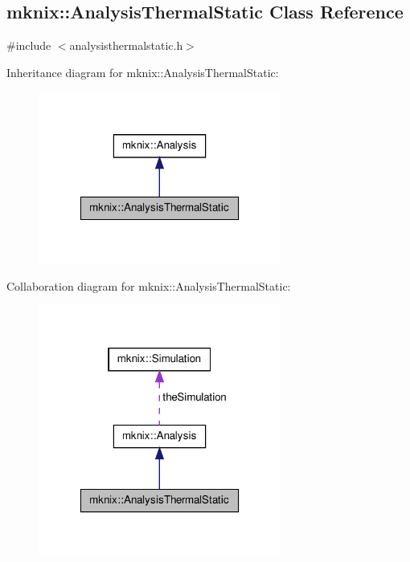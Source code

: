 \hypertarget{classmknix_1_1_analysis_thermal_static}{\subsection{mknix\-:\-:Analysis\-Thermal\-Static Class Reference}
\label{classmknix_1_1_analysis_thermal_static}
}


{\ttfamily \#include $<$analysisthermalstatic.\-h$>$}



Inheritance diagram for mknix\-:\-:Analysis\-Thermal\-Static\-:\nopagebreak
\begin{figure}[H]
\begin{center}
\leavevmode
\includegraphics[width=226pt]{d1/df3/classmknix_1_1_analysis_thermal_static__inherit__graph}
\end{center}
\end{figure}


Collaboration diagram for mknix\-:\-:Analysis\-Thermal\-Static\-:\nopagebreak
\begin{figure}[H]
\begin{center}
\leavevmode
\includegraphics[width=226pt]{d1/d71/classmknix_1_1_analysis_thermal_static__coll__graph}
\end{center}
\end{figure}
